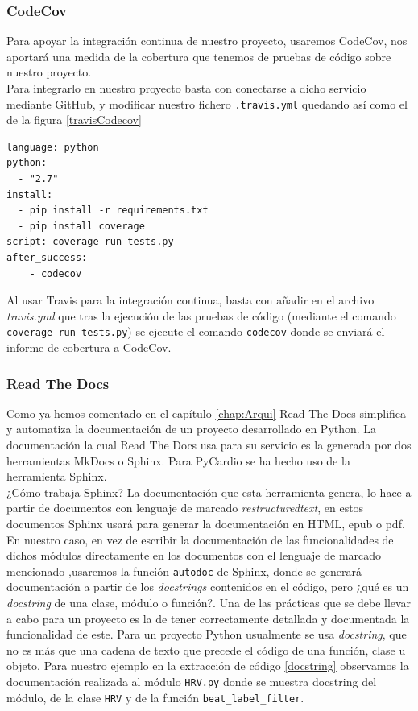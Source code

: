 \subsubsection*{CodeCov}
\label{subsubsec:CodeCov}
Para apoyar la integración continua de nuestro proyecto, usaremos CodeCov, nos aportará una medida de la cobertura que tenemos de pruebas de código sobre nuestro proyecto. \\
Para integrarlo en nuestro proyecto basta con conectarse a dicho servicio mediante GitHub, y modificar nuestro fichero \texttt{.travis.yml} quedando así como el de la figura \ref{travisCodecov}

\begin{lstlisting}[caption={\texttt{.travis.yml} para integrar CodeCov},label=travisCodecov]
language: python
python:
  - "2.7"
install:
  - pip install -r requirements.txt
  - pip install coverage
script: coverage run tests.py
after_success:
    - codecov
\end{lstlisting}

Al usar Travis para la integración continua, basta con añadir en el archivo  \textit{travis.yml} que tras la ejecución de las pruebas de código (mediante el comando \texttt{coverage run tests.py}) se ejecute el comando \texttt{codecov} donde se enviará el informe de cobertura a CodeCov. 

\subsubsection*{Read The Docs}
\label{subusub:rtd}
Como ya hemos comentado en el capítulo \ref{chap:Arqui} Read The Docs simplifica y automatiza la documentación de un proyecto desarrollado en Python. La documentación la cual Read The Docs usa para su servicio es la generada por dos herramientas MkDocs o Sphinx. Para PyCardio se ha hecho uso de la herramienta Sphinx. \\
¿Cómo trabaja Sphinx? La documentación que esta herramienta genera, lo hace a partir de documentos con lenguaje de marcado \textit{restructuredtext}, en estos documentos Sphinx usará para generar la documentación en HTML, epub o pdf. En nuestro caso, en vez de escribir la documentación de las funcionalidades de dichos módulos directamente en los documentos con el lenguaje de marcado mencionado ,usaremos la función \texttt{autodoc} de Sphinx, donde se generará documentación a partir de los \textit{docstrings} contenidos en el código, pero ¿qué es un \textit{docstring} de una clase, módulo o función?. Una de las prácticas que se debe llevar a cabo para un proyecto es la de tener correctamente detallada y documentada la funcionalidad de este. Para un proyecto Python usualmente se usa \textit{docstring}, que no es más que una cadena de texto que precede el código de una función, clase u objeto. Para nuestro ejemplo en la extracción de código \ref{docstring} observamos la documentación realizada al módulo \texttt{HRV.py} donde se muestra docstring del módulo, de la clase \texttt{HRV} y de la función \texttt{beat\_label\_filter}.

